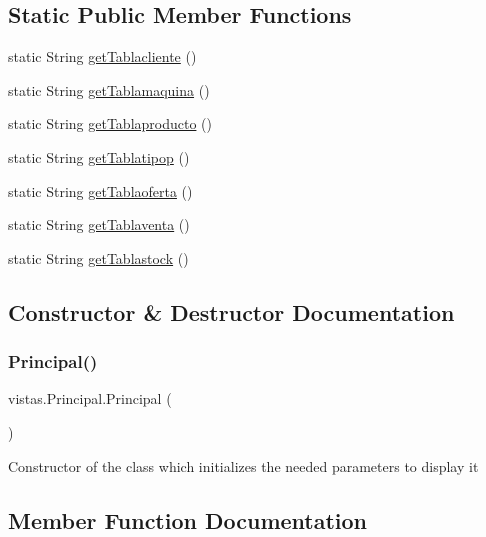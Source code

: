 \subsection*{Static Public Member Functions}
\begin{DoxyCompactItemize}
\item 
static String \mbox{\hyperlink{classvistas_1_1_principal_a2330cd451138f9f602cee0c5c0cd5c08}{get\+Tablacliente}} ()
\item 
static String \mbox{\hyperlink{classvistas_1_1_principal_ac784d0415cbb5e3932f088d68876c91a}{get\+Tablamaquina}} ()
\item 
static String \mbox{\hyperlink{classvistas_1_1_principal_a39c3c478060c985a23f97e38dc88e61b}{get\+Tablaproducto}} ()
\item 
static String \mbox{\hyperlink{classvistas_1_1_principal_a3cf8de4e71a59fc279da130e39af6cd2}{get\+Tablatipop}} ()
\item 
static String \mbox{\hyperlink{classvistas_1_1_principal_afe7ddf018ad429301b1aca1dbfc4770d}{get\+Tablaoferta}} ()
\item 
static String \mbox{\hyperlink{classvistas_1_1_principal_aa81de202b442c060c9db8f564ba288b3}{get\+Tablaventa}} ()
\item 
static String \mbox{\hyperlink{classvistas_1_1_principal_a004b49e26858496e0f5097a079b3aba5}{get\+Tablastock}} ()
\end{DoxyCompactItemize}


\subsection{Constructor \& Destructor Documentation}
\mbox{\label{classvistas_1_1_principal_acf014fac1f15c33d980e722fe1e6d58f}} 
\subsubsection{\texorpdfstring{Principal()}{Principal()}}
{\footnotesize\ttfamily vistas.\+Principal.\+Principal (\begin{DoxyParamCaption}{ }\end{DoxyParamCaption})}

Constructor of the class which initializes the needed parameters to display it 

\subsection{Member Function Documentation}
\mbox{\label{classvistas_1_1_principal_a8371dc6a7768c2ec5afae9d2b266b139}} 
